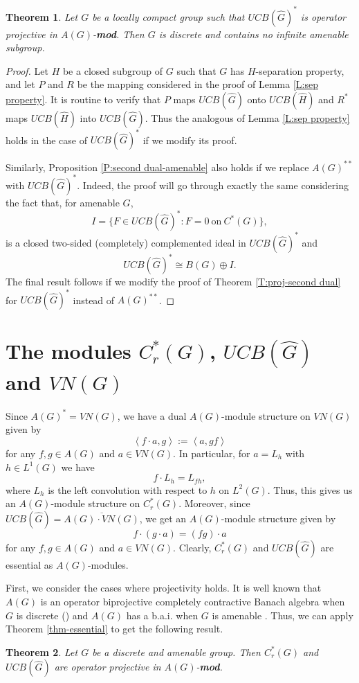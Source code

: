 \documentclass[10pt]{amsart}
\newtheorem{thm}{Theorem}
\numberwithin{thm}{section}
\numberwithin{equation}{section}
\begin{document}
\begin{thm}\label{T:proj-UCB dual}
Let $G$ be a locally compact group such that $UCB(\widehat{G})^*$ is operator projective in $A(G)$-{\textbf{mod}}.
Then $G$ is discrete and contains no infinite amenable subgroup.
\end{thm}

\begin{proof}
Let $H$ be a closed subgroup of $G$ such that $G$ has $H$-separation property, and let $P$ and $R$ be 
the mapping considered in the proof of Lemma \ref{L:sep property}. It is routine to verify that
$P$ maps $UCB(\widehat{G})$ onto $UCB(\widehat{H})$ and $R^*$ maps $UCB(\widehat{H})$ into
$UCB(\widehat{G})$. Thus the analogous of Lemma \ref{L:sep property} holds in the case of $UCB(\widehat{G})^*$
if we modify its proof.

Similarly, Proposition \ref{P:second dual-amenable} also holds if we replace $A(G)^{**}$ with $UCB(\widehat{G})^*$.
Indeed, the proof will go through exactly the same considering the fact that, for amenable $G$, 
$$I=\{ F\in UCB(\widehat{G})^* : F=0 \ \text{on} \ C^*(G) \},$$
is a closed two-sided (completely) complemented ideal in $UCB(\widehat{G})^*$ and
$$UCB(\widehat{G})^* \cong B(G)\oplus I.$$  
The final result follows if we modify the proof of Theorem \ref{T:proj-second dual} for
$UCB(\widehat{G})^*$ instead of $A(G)^{**}$.
\end{proof}

\section{The modules $C^*_r(G)$, $UCB(\widehat{G})$ and $VN(G)$}\label{C*r(G)VN(G)}

Since $A(G)^* = VN(G)$, we have a dual $A(G)$-module structure on $VN(G)$ given by
	$$\left\langle f \cdot a, g \right\rangle := \left\langle a, g f\right\rangle$$
for any $f,g \in A(G)$ and $a\in VN(G)$. In particular, for $a = L_h$ with $h\in L^1(G)$ we have
	$$f \cdot L_h = L_{f h},$$
where $L_h$ is the left convolution with respect to $h$ on $L^2(G)$.
Thus, this gives us an $A(G)$-module structure on $C^*_r(G)$.
Moreover, since $UCB(\widehat{G}) = \overline{A(G)\cdot VN(G)}$, we get an $A(G)$-module structure given by
	$$f\cdot(g\cdot a) = (f g)\cdot a$$
for any $f,g\in A(G)$ and $a\in VN(G)$.
Clearly, $C^*_r(G)$ and $UCB(\widehat{G})$ are essential as $A(G)$-modules.

First, we consider the cases where projectivity holds.
It is well known that $A(G)$ is an operator biprojective completely contractive Banach algebra when $G$ is discrete (\cite{W02})
and $A(G)$ has a b.a.i. when $G$ is amenable \cite{Lep}.
Thus, we can apply Theorem \ref{thm-essential} to get the following result.
	\begin{thm}\label{thm-pos-Cr(G)}
	Let $G$ be a discrete and amenable group. Then $C^*_r(G)$ and $UCB(\widehat{G})$ are operator projective in $A(G)$-{\bf mod}.
	\end{thm}
\end{document}
